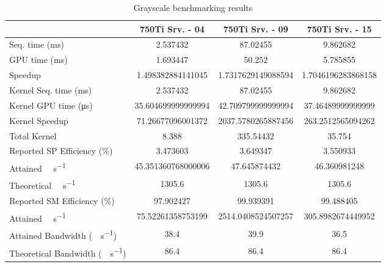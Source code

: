 \begin{table}[H]
	\centering
	\caption{Grayscale benchmarking results}
	\label{tab:grayscale-results}
	\begin{tabular}{lS[table-format=7.1]S[table-format=7.1]S[table-format=7.1]}
		\toprule
			~ & {\textbf{750Ti Srv. - 04}} & {\textbf{750Ti Srv. - 09}} & {\textbf{750Ti Srv. - 15}} \\
		\midrule
			{Seq. time (\si{\milli\second})} & 2.537432 & 87.02455 & 9.862682 \\
			{GPU time (\si{\milli\second})} & 1.693447 & 50.252 & 5.785855 \\
			{Speedup} & 1.498382884141045 &1.7317629149088594 & 1.7046196283868158 \\
		\midrule
			{Kernel Seq. time (\si{\milli\second})} & 2.537432 & 87.02455 & 9.862682 \\
			{Kernel GPU time (\si{\micro\second})} & 35.604699999999994 & 42.709799999999994 & 37.46489999999999 \\
			{Kernel Speedup} & 71.26677096001372 & 2037.5780265887456 & 263.2512565094262 \\
		\midrule
			{Total Kernel \si{\mega\flops}} & 8.388 & 335.54432 & 35.754 \\
			{Reported SP Efficiency (\si{\percent})} & 3.473603 & 3.649347 & 3.550933 \\
			{Attained \si{\giga\flops\per\second}} & 45.351360768000006 & 47.645874432 & 46.360981248 \\
			{Theoretical \si{\giga\flops\per\second}} & 1305.6 & 1305.6 & 1305.6 \\
		\midrule
			{Reported SM Efficiency (\si{\percent})} & 97.902427 & 99.939391 & 99.488405 \\
			{Attained \si{\giga\iops\per\second}} & 75.52261358753199 & 2514.0408524507257 & 305.8982674449952 \\			
		\midrule
			{Attained Bandwidth (\si{\giga\byte\per\second})} & 38.4 & 39.9  & 36.5 \\
			{Theoretical Bandwidth (\si{\giga\byte\per\second})}	& 86.4 & 86.4 & 86.4 \\
		\bottomrule
	\end{tabular}
\end{table}